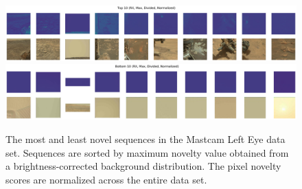 \begin{landscape}
\begin{figure}
\centering
\includegraphics[width=\linewidth]{figs/msl/top10.jpg}
\includegraphics[width=\linewidth]{figs/msl/bottom10.jpg}
\caption[Examples of the Most and Least Novel Images in the Mastcam Left Eye Data Set]{The most and least novel sequences in the Mastcam Left Eye data set. Sequences are sorted by maximum novelty value obtained from a brightness-corrected background distribution. The pixel novelty scores are normalized across the entire data set.}
\label{msl/fig:sorted}
\end{figure}
\end{landscape}

